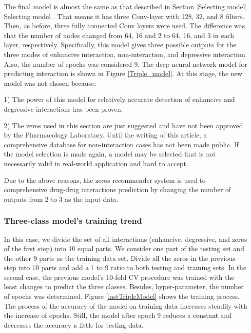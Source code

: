 \documentclass{bmcart}
\begin{document}
The final model is almost the same as that described in Section \ref{Selecting model}
Selecting model
. That means it has three Conv-layer with 128, 32, and 8 filters. Then, as before, three fully connected Conv layers were used. The difference was that the number of nodes changed from 64, 16 and 2 to 64, 16, and 3 in each layer, respectively. Specifically, this model gives three possible outputs for the three modes of enhancive interaction, non-interaction, and depressive interaction. Also, the number of epochs was considered 9. The deep neural network model for predicting interaction is shown in Figure
\ref{Triple_model}. At this stage, the new model was not chosen because:

1) The power of this model for relatively accurate detection of enhancive and degressive interactions has been proven.

2) The zeros used in this section are just suggested and have not been approved by the Pharmacology Laboratory. Until the writing of this article, a comprehensive database for non-interaction cases has not been made public. If the model selection is made again, a model may be selected that is not necessarily valid in real-world application and hard to accept.

Due to the above reasons, the zeros recommender system is used to comprehensive drug-drug interactions prediction by changing the number of outputs from 2 to 3 as the input data.


\subsubsection*{Three-class model's training trend}
In this case, we divide the set of all interactions (enhancive, degressive, and zeros of the first step) into 10 equal parts. We consider one part of the testing set and the other 9 parts as the training data set. Divide all the zeros in the previous step into 10 parts and add a 1 to 9 ratio to both testing and training sets. In the second case, the previous model's 10-fold CV procedure was trained with the least changes to predict the three classes. Besides, hyper-parameter, the number of epochs was determined. Figure \ref{lastTripleModel} shows the training process. The process of the accuracy of the model on training data increases steadily with the increase of epochs. Still, the model after epoch 9 reduces a constant and decreases the accuracy a little for testing data.
\end{document}
